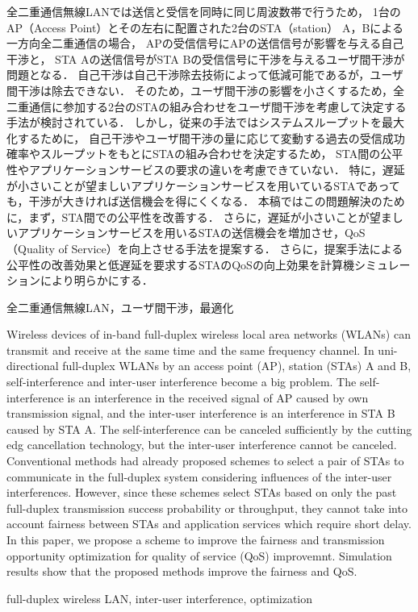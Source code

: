 \documentclass[technicalreport]{ieicej}
\begin{document}
\begin{jabstract}
	全二重通信無線LANでは送信と受信を同時に同じ周波数帯で行うため，
	1台のAP（Access Point）とその左右に配置された2台のSTA（station） A，Bによる一方向全二重通信の場合，
	APの受信信号にAPの送信信号が影響を与える自己干渉と，
	STA Aの送信信号がSTA Bの受信信号に干渉を与えるユーザ間干渉が問題となる．
	自己干渉は自己干渉除去技術によって低減可能であるが，ユーザ間干渉は除去できない．
	そのため，ユーザ間干渉の影響を小さくするため，全二重通信に参加する2台のSTAの組み合わせをユーザ間干渉を考慮して決定する手法が検討されている．
	しかし，従来の手法ではシステムスループットを最大化するために，
	自己干渉やユーザ間干渉の量に応じて変動する過去の受信成功確率やスループットをもとにSTAの組み合わせを決定するため，
	STA間の公平性やアプリケーションサービスの要求の違いを考慮できていない．
	特に，遅延が小さいことが望ましいアプリケーションサービスを用いているSTAであっても，干渉が大きければ送信機会を得にくくなる．
	本稿ではこの問題解決のために，まず，STA間での公平性を改善する．
	さらに，遅延が小さいことが望ましいアプリケーションサービスを用いるSTAの送信機会を増加させ，QoS（Quality of Service）を向上させる手法を提案する．
	さらに，提案手法による公平性の改善効果と低遅延を要求するSTAのQoSの向上効果を計算機シミュレーションにより明らかにする．
\end{jabstract}
\begin{jkeyword}
全二重通信無線LAN，ユーザ間干渉，最適化
\end{jkeyword}
\begin{eabstract}
	Wireless devices of in-band full-duplex wireless local area networks (WLANs) can transmit and receive at the same time and the same frequency channel.
	In uni-directional full-duplex WLANs by an access point (AP), station (STAs) A and B,
	self-interference and inter-user interference become a big problem.
	The self-interference is an interference in the received signal of AP caused by own transmission signal,
	and the inter-user interference is an interference in STA B caused by STA A.
	The self-interference can be canceled sufficiently by the cutting edg cancellation technology, but the inter-user interference cannot be canceled.
	Conventional methods had already proposed schemes to select a pair of STAs to communicate in the full-duplex system considering influences of the inter-user interferences.
	However, since these schemes select STAs based on only the past full-duplex transmission success probability or throughput, they cannot take into account fairness between STAs and application services which require short delay.
	In this paper, we propose a scheme to improve the fairness and transmission opportunity optimization for quality of service (QoS) improvemnt.
	Simulation results show that the proposed methods improve the fairness and QoS.

\end{eabstract}
\begin{ekeyword}
full-duplex wireless LAN, inter-user interference, optimization
\end{ekeyword}
\end{document}
